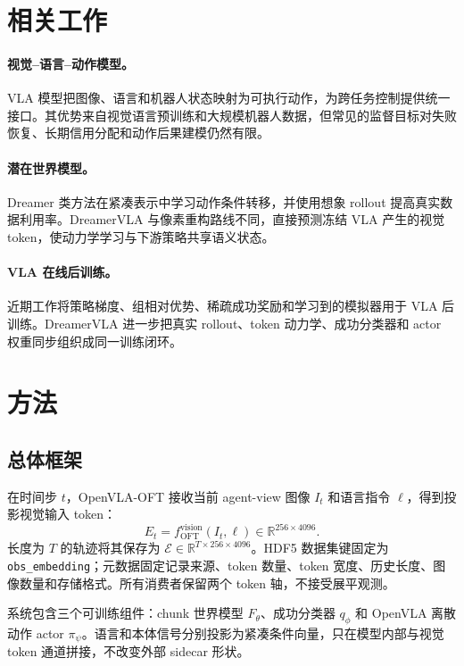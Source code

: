 \documentclass{article}
\begin{document}
\section{相关工作}

\paragraph{视觉--语言--动作模型。}
VLA 模型把图像、语言和机器人状态映射为可执行动作，为跨任务控制提供统一接口。其优势来自视觉语言预训练和大规模机器人数据，但常见的监督目标对失败恢复、长期信用分配和动作后果建模仍然有限。

\paragraph{潜在世界模型。}
Dreamer 类方法在紧凑表示中学习动作条件转移，并使用想象 rollout 提高真实数据利用率。DreamerVLA 与像素重构路线不同，直接预测冻结 VLA 产生的视觉 token，使动力学学习与下游策略共享语义状态。

\paragraph{VLA 在线后训练。}
近期工作将策略梯度、组相对优势、稀疏成功奖励和学习到的模拟器用于 VLA 后训练。DreamerVLA 进一步把真实 rollout、token 动力学、成功分类器和 actor 权重同步组织成同一训练闭环。

\section{方法}

\subsection{总体框架}

在时间步 $t$，OpenVLA-OFT 接收当前 agent-view 图像 $I_t$ 和语言指令 $\ell$，得到投影视觉输入 token：
\[
E_t=f_{\mathrm{OFT}}^{\mathrm{vision}}(I_t,\ell)
  \in\mathbb{R}^{256\times4096}.
\]
长度为 $T$ 的轨迹将其保存为
$\mathcal{E}\in\mathbb{R}^{T\times256\times4096}$。HDF5 数据集键固定为 \texttt{obs\_embedding}；元数据固定记录来源、token 数量、token 宽度、历史长度、图像数量和存储格式。所有消费者保留两个 token 轴，不接受展平观测。

系统包含三个可训练组件：chunk 世界模型 $F_\theta$、成功分类器 $q_\phi$ 和 OpenVLA 离散动作 actor $\pi_\psi$。语言和本体信号分别投影为紧凑条件向量，只在模型内部与视觉 token 通道拼接，不改变外部 sidecar 形状。
\end{document}
